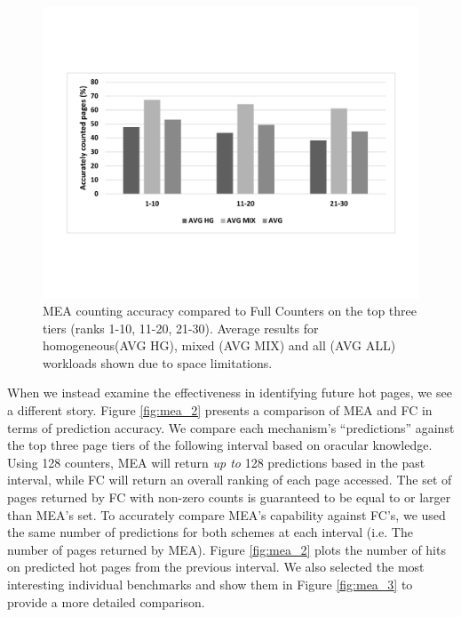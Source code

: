 \begin{figure}[t]
\centering
  \includegraphics[scale=.3]{figures/mea_1_v2.pdf}
  \caption{MEA counting accuracy compared to Full Counters on the top three tiers (ranks 1-10, 11-20, 21-30). Average results for homogeneous(AVG HG), mixed (AVG MIX) and all (AVG ALL) workloads shown due to space limitations.}
  \label{fig:mea_1}
\end{figure}

When we instead examine the effectiveness in identifying future hot pages,
we see a different story.  Figure \ref{fig:mea_2} presents a comparison of MEA and FC in terms of prediction accuracy. We compare each mechanism's 
``predictions'' against the top three page tiers of the following interval based on oracular knowledge. 
Using 128 counters, MEA will return \textit{up to} 128 predictions based in the past interval, while FC will return an overall ranking of each page accessed. The set of pages returned by FC with non-zero counts is guaranteed to be equal to or larger than MEA's set. To accurately compare MEA's capability against FC's, we used the same number of predictions for both schemes at each interval (i.e. The number of pages returned by MEA).
Figure \ref{fig:mea_2} plots the number of hits on predicted hot pages from the previous interval. We also selected the most interesting individual benchmarks and show them in Figure \ref{fig:mea_3} to provide a more detailed comparison. 


